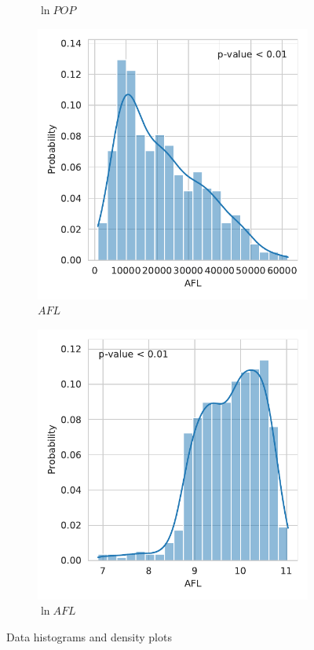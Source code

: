 \documentclass[12pt,a4paper]{article}
\begin{document}
\begin{figure}[htbp]
\begin{subfigure}{0.45\textwidth}
\caption{$\ln POP$}
\end{subfigure}
\begin{subfigure}{0.45\textwidth}
\includegraphics[width=\textwidth]{./plots/dis/distplot_AFL.pdf}
\caption{$AFL$}
\end{subfigure}
\begin{subfigure}{0.45\textwidth}
\includegraphics[width=\textwidth]{./plots/dis/distplot_lnAFL.pdf}
\caption{$\ln AFL$}
\end{subfigure}
\caption[]{Data histograms and density plots}
\end{figure}
\end{document}
